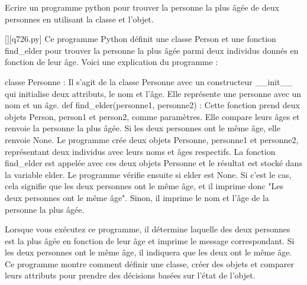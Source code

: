        \question
        Ecrire un programme python pour trouver la personne la plus âgée de deux personnes en utilisant la classe et l'objet.
        \par
        \begin{solution}
            \renewcommand{\nomfichier}{q726.py}
            \pythonfile{\chemincode \nomfichier}[][\nomfichier]
            Ce programme Python définit une classe Person et une fonction find\_elder pour trouver la personne la plus âgée parmi deux individus donnés en fonction de leur âge. Voici une explication du programme :

    classe Personne : Il s'agit de la classe Personne avec un constructeur \_\_init\_\_ qui initialise deux attributs, le nom et l'âge. Elle représente une personne avec un nom et un âge.
    def find\_elder(personne1, personne2) : Cette fonction prend deux objets Person, person1 et person2, comme paramètres. Elle compare leurs âges et renvoie la personne la plus âgée. Si les deux personnes ont le même âge, elle renvoie None.
    Le programme crée deux objets Personne, personne1 et personne2, représentant deux individus avec leurs noms et âges respectifs.
    La fonction find\_elder est appelée avec ces deux objets Personne et le résultat est stocké dans la variable elder.
    Le programme vérifie ensuite si elder est None. Si c'est le cas, cela signifie que les deux personnes ont le même âge, et il imprime donc "Les deux personnes ont le même âge". Sinon, il imprime le nom et l'âge de la personne la plus âgée.

Lorsque vous exécutez ce programme, il détermine laquelle des deux personnes est la plus âgée en fonction de leur âge et imprime le message correspondant. Si les deux personnes ont le même âge, il indiquera que les deux ont le même âge. Ce programme montre comment définir une classe, créer des objets et comparer leurs attributs pour prendre des décisions basées sur l'état de l'objet.
        \end{solution}
        

